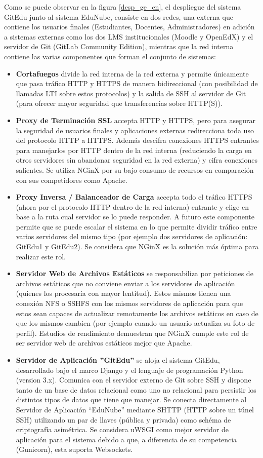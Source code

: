 Como se puede observar en la figura \ref{desp_ge_en}, el despliegue del sistema GitEdu junto al sistema EduNube, consiste en dos redes, una externa que contiene los usuarios finales (Estudiantes, Docentes, Administradores) en adición a sistemas externas como los dos LMS  institucionales (Moodle y OpenEdX) y el servidor de Git (GitLab Community Edition), mientras que la red interna contiene las varias componentes que forman el conjunto de sistemas:
\begin{itemize}
	\item \textbf{Cortafuegos} divide la red interna de la red externa y permite únicamente que pasa tráfico HTTP y HTTPS de manera bidireccional (con posibilidad de llamadas LTI  sobre estos protocolos) y la salida de SSH al servidor de Git (para ofrecer mayor seguridad que transferencias sobre HTTP(S)).
    \item \textbf{Proxy de Terminación SSL} accepta HTTP y HTTPS, pero para asegurar la seguridad de usuarios finales y aplicaciones externas redirecciona toda uso del protocolo HTTP a HTTPS. Además descifra conexiones HTTPS entrantes para manejarlos por HTTP dentro de la red interna (reduciendo la carga en otros servidores sin abandonar seguridad en la red externa) y cifra conexiones salientes. Se utiliza NGinX por su bajo consumo de recursos en comparación con sus competidores como Apache.
    \item \textbf{Proxy Inversa / Balanceador de Carga} accepta todo el tráfico HTTPS (ahora por el protocolo HTTP dentro de la red interna) entrante y elige en base a la ruta cual servidor se lo puede responder. A futuro este componente permite que se puede escalar el sistema en lo que permite dividir tráfico entre varios servidores del mismo tipo (por ejemplo dos servidores de aplicación: GitEdu1 y GitEdu2). Se considera que NGinX es la solución más óptima para realizar este rol.
    \item \textbf{Servidor Web de Archivos Estáticos} se responsabiliza por peticiones de archivos estáticos que no conviene enviar a los servidores de aplicación (quienes los procesaría con mayor lentitud). Estos mismos tienen una conexión NFS o SSHFS con los mismos servidores de aplicación para que estos sean capaces de actualizar remotamente los archivos estáticos en caso de que los mismos cambien (por ejemplo cuando un usuario actualiza su foto de perfil). Estudios de rendimiento demuestran que NGinX cumple este rol de ser servidor web de archivos estáticos mejor que Apache.
    \item \textbf{Servidor de Aplicación ''GitEdu''} se aloja el sistema GitEdu, desarrollado bajo el marco Django y el lenguaje de programación Python (version 3.x). Comunica con el servidor externo de Git sobre SSH y dispone tanto de un base de datos relacional como uno no relacional para persistir los distintos tipos de datos que tiene que manejar. Se conecta directamente al Servidor de Aplicación “EduNube” mediante SHTTP (HTTP sobre un túnel SSH) utilizando un par de llaves (pública y privada) como schéma de criptografía asimétrica. Se considera uWSGI como mejor servidor de aplicación para el sistema debido a que, a diferencia de su competencia (Gunicorn), esta suporta Websockets.

\end{itemize}

